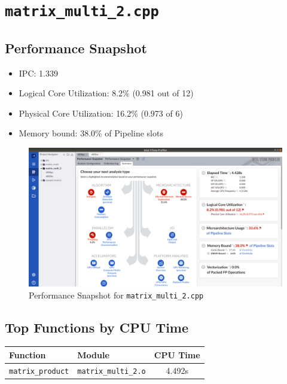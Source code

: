 \documentclass[11pt, swedish, openany]{book}
\begin{document}
\newpage
\section{\texttt{matrix\_multi\_2.cpp}}

\subsection*{Performance Snapshot}
\begin{itemize}
    \item IPC: 1.339
    \item Logical Core Utilization: 8.2\% (0.981 out of 12)
    \item Physical Core Utilization: 16.2\% (0.973 of 6)
    \item Memory bound: 38.0\% of Pipeline slots
\end{itemize}

\begin{figure}[H]
    \centering
    \includegraphics[scale=0.25]{vtune/matrix_multi_2/ps.png}
    \caption{Performance Snapshot for \texttt{matrix\_multi\_2.cpp}}
\end{figure}

\newpage
\subsection*{Top Functions by CPU Time}
\begin{table}[H]
    \begin{tabular}{||l|l||c||}
        \hline
        Function                 & Module                      & CPU Time \\
        \hline
        \texttt{matrix\_product} & \texttt{matrix\_multi\_2.o} & 4.492s   \\
        \hline
    \end{tabular}
\end{table}
\end{document}
